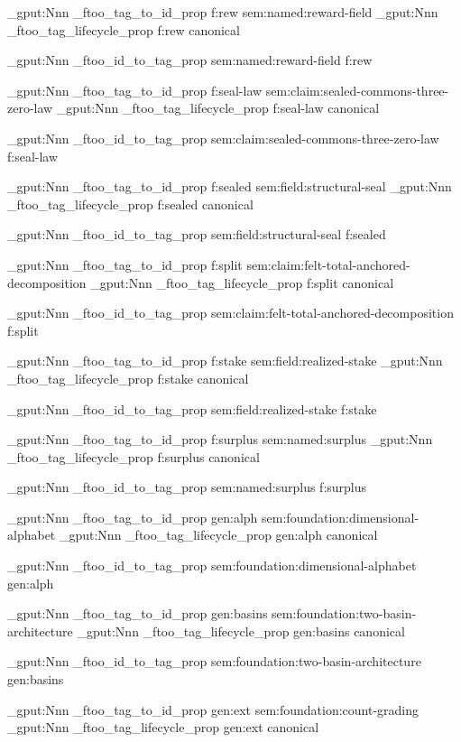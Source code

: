\prop_gput:Nnn \g_ftoo_tag_to_id_prop { f:rew } { sem:named:reward-field }
\prop_gput:Nnn \g_ftoo_tag_lifecycle_prop { f:rew } { canonical }

\prop_gput:Nnn \g_ftoo_id_to_tag_prop { sem:named:reward-field } { f:rew }


\prop_gput:Nnn \g_ftoo_tag_to_id_prop { f:seal-law } { sem:claim:sealed-commons-three-zero-law }
\prop_gput:Nnn \g_ftoo_tag_lifecycle_prop { f:seal-law } { canonical }

\prop_gput:Nnn \g_ftoo_id_to_tag_prop { sem:claim:sealed-commons-three-zero-law } { f:seal-law }


\prop_gput:Nnn \g_ftoo_tag_to_id_prop { f:sealed } { sem:field:structural-seal }
\prop_gput:Nnn \g_ftoo_tag_lifecycle_prop { f:sealed } { canonical }

\prop_gput:Nnn \g_ftoo_id_to_tag_prop { sem:field:structural-seal } { f:sealed }


\prop_gput:Nnn \g_ftoo_tag_to_id_prop { f:split } { sem:claim:felt-total-anchored-decomposition }
\prop_gput:Nnn \g_ftoo_tag_lifecycle_prop { f:split } { canonical }

\prop_gput:Nnn \g_ftoo_id_to_tag_prop { sem:claim:felt-total-anchored-decomposition } { f:split }


\prop_gput:Nnn \g_ftoo_tag_to_id_prop { f:stake } { sem:field:realized-stake }
\prop_gput:Nnn \g_ftoo_tag_lifecycle_prop { f:stake } { canonical }

\prop_gput:Nnn \g_ftoo_id_to_tag_prop { sem:field:realized-stake } { f:stake }


\prop_gput:Nnn \g_ftoo_tag_to_id_prop { f:surplus } { sem:named:surplus }
\prop_gput:Nnn \g_ftoo_tag_lifecycle_prop { f:surplus } { canonical }

\prop_gput:Nnn \g_ftoo_id_to_tag_prop { sem:named:surplus } { f:surplus }


\prop_gput:Nnn \g_ftoo_tag_to_id_prop { gen:alph } { sem:foundation:dimensional-alphabet }
\prop_gput:Nnn \g_ftoo_tag_lifecycle_prop { gen:alph } { canonical }

\prop_gput:Nnn \g_ftoo_id_to_tag_prop { sem:foundation:dimensional-alphabet } { gen:alph }


\prop_gput:Nnn \g_ftoo_tag_to_id_prop { gen:basins } { sem:foundation:two-basin-architecture }
\prop_gput:Nnn \g_ftoo_tag_lifecycle_prop { gen:basins } { canonical }

\prop_gput:Nnn \g_ftoo_id_to_tag_prop { sem:foundation:two-basin-architecture } { gen:basins }


\prop_gput:Nnn \g_ftoo_tag_to_id_prop { gen:ext } { sem:foundation:count-grading }
\prop_gput:Nnn \g_ftoo_tag_lifecycle_prop { gen:ext } { canonical }

